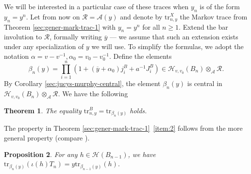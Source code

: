 \documentclass[11pt,leqno]{article}
\newtheorem{theorem}{Theorem}[subsection]
\newtheorem{proposition}[theorem]{Proposition}
\theoremstyle{definition}
\theoremstyle{definition}
\theoremstyle{remark}
\newcommand{\He}{\mathcal{H}}
\newcommand{\tr}{\mathrm{tr}}
\begin{document}
We will be interested in a particular case of these traces when $y_n$ is of the form $y_n = y^n.$ Let from now on $\mathcal{R} = \mathcal{A}(y)$ and denote by $\tr^{X}_{n,y}$ the Markov trace from Theorem \ref{sec:gener-mark-trac-1} with $y_n = y^n$ for all $n \geq 1$. Extend the bar involution to $\mathcal{R}$, formally writing $\overline{y}$ --- we assume that such an extension exists under any specialization of $y$ we will use. To simplify the formulas, we adopt the notation $\alpha = v - v^{-1}, \alpha_0 = v_0 - v_0^{-1}$.
Define the elements
\[
  \beta_n(y) = \prod_{i = 1}^n(1 + (\overline{y}+\alpha_0)j^B_i + a^{-1}J^B_i) \in \He_{v,v_0}(B_n) \otimes_\mathcal{A}\mathcal{R}.
\]
By Corollary \ref{sec:jucys-murphy-central}, the element $\beta_n(y)$ is central in $\He_{v,v_0}(B_n)\otimes_\mathcal{A}\mathcal{R}$. 
We have the following
\begin{theorem}
  \label{sec:gener-mark-trac-2}
  The equality $\tr_{n,y}^B = \tr_{\beta_n(y)}$ holds.
\end{theorem}
The property in Theorem \ref{sec:gener-mark-trac-1}~\ref{item:2} follows from the more general property (compare \cite[Proposition 4.5]{geckMarkovTracesKnot2004}).
\begin{proposition}
  \label{sec:gener-mark-trac-5}
 For any $h \in \He(B_{n-1})$, we have $\tr_{\beta_n(y)}(\iota(h)T_n) = y\tr_{\beta_{n-1}(y)}(h).$ 
\end{proposition}
\end{document}
